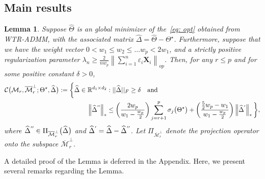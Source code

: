 \documentclass[12pt]{article}
\newcommand*{\myprime}{^{\prime}\mkern-1.2mu}
\newcommand*{\mydprime}{^{\prime\prime}\mkern-1.2mu}
\newtheorem{lemma}[theorem]{Lemma}
\begin{document}
\subsection{Main results}
\begin{lemma} \label{Lemma 3.1}
Suppose $\widehat{\Theta}$ is an global minimizer of the~\eqref{eq: opt} obtained from WTR-ADMM, with the associated matrix $\widehat{\Delta} = \widehat{\Theta}-\Theta^{\star}$.
Furthermore, suppose that we have the weight vector $0 < w_{1} \leq w_{2} \leq \dots w_{p} < 2w_{1}$, and a strictly positive regularization parameter $\lambda_{n}\geq\frac{2}{nw_{p}}\left\|\sum_{i=1}^{n}\varepsilon_{i}\mathbf{X}_{i}\right\|_{op}$.
Then, for any $r\leq p$ and for some positive constant $\delta>0$, 
\begin{align*}
    \mathcal{C}\big(\mathcal{M}_{r},\overline{\mathcal{M}}_{r}^{\perp};\Theta^{\star}, \widehat{\Delta} \big) 
    := \bigg\{& \widehat{\Delta}\in\mathbb{R}^{d_{1}\times d_{2}} : || \widehat{\Delta}||_{F} \geq \delta \quad \text{and} \\ 
    & \qquad \left\|\widehat{\Delta}^{\mydprime}\right\|_{*} \leq \bigg(\frac{2w_{p}}{w_{1}-\frac{w_{p}}{2}}\bigg)
    \sum_{j=r+1}^{p}\sigma_{j}\big(\Theta^{\star}\big) + \bigg(\frac{\frac{5}{2}w_{p}-w_{1}}{w_{1}-\frac{w_{p}}{2}}\bigg)
    \left\|\widehat{\Delta}^{\myprime}\right\|_{*} \bigg\},
\end{align*}
where $\widehat{\Delta}^{\mydprime} \in \Pi_{\overline{\mathcal{M}}_{r}^{\perp}}\big(\widehat{\Delta}\big)$ and $\widehat{\Delta}^{\myprime}=\widehat{\Delta}-\widehat{\Delta}^{\mydprime}$.
Let $\Pi_{\overline{\mathcal{M}}_{r}^{\perp}}$ denote the projection operator onto the subspace $\overline{\mathcal{M}}_{r}^{\perp}$.
\end{lemma}
A detailed proof of the Lemma is deferred in the Appendix.
Here, we present several remarks regarding the Lemma.
\end{document}
